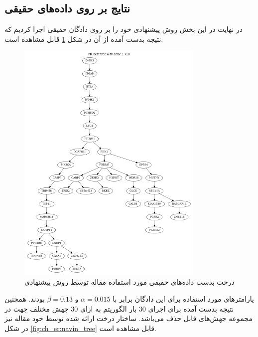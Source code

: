 \subsection{نتایج بر روی داده‌های حقیقی}
در نهایت در این بخش روش پیشنهادی خود را بر روی دادگان حقیقی \cite{davis2016computing} اجرا کردیم که نتیجه بدست آمده از آن در شکل \ref{fig:ch_er:pm_tree} قابل مشاهده است.

\begin{figure}[!ht]
	\centering
	\includegraphics[width=0.8\textwidth]{img/chaps/er/pm}
	\caption{درخت بدست داده‌های حقیقی مورد استفاده مقاله \cite{davis2016computing} توسط روش پیشنهادی}
	\label{fig:ch_er:pm_tree}
\end{figure}
\noindent
پارامترهای مورد استفاده برای این دادگان برابر با $\alpha=0.015$ و $\beta=0.13$ بودند. همچنین نتیجه بدست آمده برای اجرای 30 بار الگوریتم به ازای 30 جهش مختلف جهت در مجموعه جهش‌های قابل حذف می‌باشد. ساختار درخت ارائه شده توسط خود مقاله نیز در شکل \ref{fig:ch_er:navin_tree} قابل مشاهده است.

